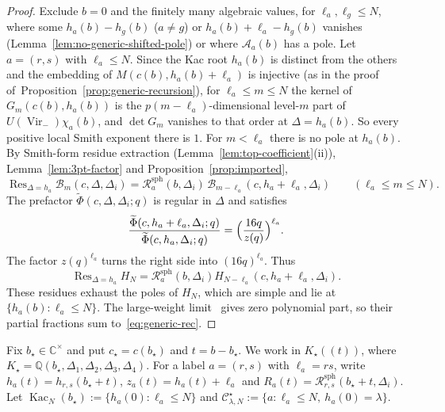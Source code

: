 \documentclass[twoside,10pt]{article}
\numberwithin{equation}{section}
\theoremstyle{slbody}
\theoremstyle{definition}
\theoremstyle{remark}
\newcommand{\Vir}{\operatorname{Vir}}
\newcommand{\Res}{\operatorname{Res}}
\begin{document}
\begin{proof}
Exclude \(b=0\) and the finitely many algebraic values, for
\(\ell_a,\ell_g\leq N\), where some \(h_a(b)-h_g(b)\) (\(a\neq g\)) or
\(h_a(b)+\ell_a-h_g(b)\) vanishes (Lemma~\ref{lem:no-generic-shifted-pole}) or where
\(\mathcal A_a(b)\) has a pole.  Let \(a=(r,s)\) with \(\ell_a\leq N\).  Since
the Kac root \(h_a(b)\) is distinct from the others and the embedding of
\(M(c(b),h_a(b)+\ell_a)\) is injective (as in the proof
of~Proposition~\ref{prop:generic-recursion}), for \(\ell_a\leq m\leq N\) the
kernel of \(G_m(c(b),h_a(b))\) is the \(p(m-\ell_a)\)-dimensional level-\(m\)
part of \(U(\Vir_-)\chi_a(b)\), and \(\det G_m\) vanishes to that order at
\(\Delta=h_a(b)\).  So every positive local Smith exponent there is \(1\).  For
\(m<\ell_a\) there is no pole at \(h_a(b)\).  By Smith-form residue extraction
(Lemma~\ref{lem:top-coefficient}(ii)), Lemma~\ref{lem:3pt-factor} and
Proposition~\ref{prop:imported},
\[
 \Res_{\Delta=h_a}\mathcal B_m(c,\Delta,\Delta_i)
 =\mathcal R^{\mathrm{sph}}_a(b,\Delta_i)\,\mathcal B_{m-\ell_a}(c,h_a+\ell_a,\Delta_i)
 \qquad(\ell_a\leq m\leq N).
\]
The prefactor \(\widetilde\Phi(c,\Delta,\Delta_i;q)\) is regular in \(\Delta\) and
satisfies
\[
 \frac{\widetilde\Phi(c,h_a+\ell_a,\Delta_i;q)}{\widetilde\Phi(c,h_a,\Delta_i;q)}
 =\Bigl(\frac{16q}{z(q)}\Bigr)^{\ell_a}.
\]
The factor \(z(q)^{\ell_a}\) turns the right side into \((16q)^{\ell_a}\). Thus
\[
 \Res_{\Delta=h_a}H_N
 =\mathcal R^{\mathrm{sph}}_a(b,\Delta_i)H_{N-\ell_a}(c,h_a+\ell_a,\Delta_i).
\]
These residues exhaust the poles of \(H_N\), which are simple and lie at
\(\{h_a(b):\ell_a\leq N\}\).  The large-weight limit~\cite[Theorem~3.1]{PolzerLargeWeight2026} gives zero
polynomial part, so their partial fractions sum to~\eqref{eq:generic-rec}.
\end{proof}

Fix \(b_\star\in\mathbb C^\times\) and put
\(c_\star=c(b_\star)\) and \(t=b-b_\star\).  We work in \(K_\star((t))\), where
\(K_\star=\mathbb Q(b_\star,\Delta_1,\Delta_2,\Delta_3,\Delta_4)\).  For a label
\(a=(r,s)\) with \(\ell_a=rs\), write \(h_a(t)=h_{r,s}(b_\star+t)\),
\(z_a(t)=h_a(t)+\ell_a\) and
\(R_a(t)=\mathcal R^{\mathrm{sph}}_{r,s}(b_\star+t,\Delta_i)\).  Let
\(\operatorname{Kac}_N(b_\star):=\{h_a(0):\ell_a\leq N\}\) and
\(\mathcal C^\star_{\lambda,N}:=\{a:\ell_a\leq N,\ h_a(0)=\lambda\}\).
\end{document}
